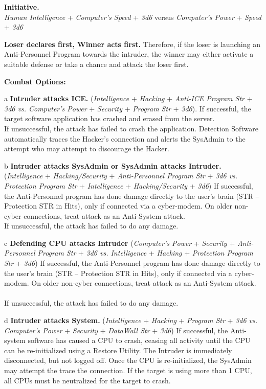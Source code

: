 \documentclass[11pt,twoside,a4paper]{article}
\newenvironment{local_enumerate}{
\begin{enumerate}
     \setlength{\itemsep}{1pt}
     \setlength{\parskip}{0pt}
     \setlength{\parsep}{0pt}}
{\end{enumerate}
}
\begin{document}
\begin{local_enumerate}
	\item \textbf{Initiative. }~\\
		\emph{Human Intelligence} + \emph{Computer's Speed} + \emph{3d6} versus
		\emph{Computer's Power} + \emph{Speed} + \emph{3d6}
	\item \textbf{Loser declares first, Winner acts first. } Therefore, if the loser is launching an Anti-Personnel Program towards the intruder, the winner may either activate a suitable defense or take a chance and attack the loser first. 
	\item \textbf{Combat Options:}
	\begin{local_enumerate}
		\item[a] \textbf{Intruder attacks ICE. } (\emph{Intelligence} + \emph{Hacking} + \emph{Anti-ICE Program Str} + \emph{3d6 vs. Computer's Power} + \emph{Security} + \emph{Program Str} + \emph{3d6}). If successful, the target software application has crashed and erased from the server. ~\\
			If unsuccessful, the attack has failed to crash the application. Detection Software automatically traces the Hacker's connection and alerts the SysAdmin to the attempt who may attempt to discourage the Hacker.
		\item[b] \textbf{Intruder attacks SysAdmin or SysAdmin attacks Intruder. } (\emph{Intelligence} + \emph{Hacking/Security} + \emph{Anti-Personnel Program Str} + \emph{3d6 vs. Protection Program Str} + \emph{Intelligence} + \emph{Hacking/Security} + \emph{3d6}) If successful, the Anti-Personnel program has done damage directly to the user's brain (STR -- Protection STR in Hits), only if connected via a cyber-modem. On older non-cyber connections, treat attack as an Anti-System attack. ~\\
			If unsuccessful, the attack has failed to do any damage.
		\item[c] \textbf{Defending CPU attacks Intruder } (\emph{Computer's Power} + \emph{Security} + \emph{Anti-Personnel Program Str} + \emph{3d6 vs. Intelligence} + \emph{Hacking} + \emph{Protection Program Str} + \emph{3d6}) If successful, the Anti-Personnel program has done damage directly to the user's brain (STR -- Protection STR in Hits), only if connected via a cyber-modem. On older non-cyber connections, treat attack as an Anti-System attack. ~\\
			If unsuccessful, the attack has failed to do any damage.
		\item[d] \textbf{Intruder attacks System. } (\emph{Intelligence} + \emph{Hacking} + \emph{Program Str} + \emph{3d6 vs. Computer's Power} + \emph{Security} + \emph{DataWall Str} + \emph{3d6}) If successful, the Anti-system software has caused a CPU to crash, ceasing all activity until the CPU can be re-initialized using a Restore Utility. The Intruder is immediately disconnected, but not logged off. Once the CPU is re-initialized, the SysAdmin may attempt the trace the connection. If the target is using more than 1 CPU, all CPUs must be neutralized for the target to crash. ~\\

\end{local_enumerate}
\end{local_enumerate}
\end{document}
